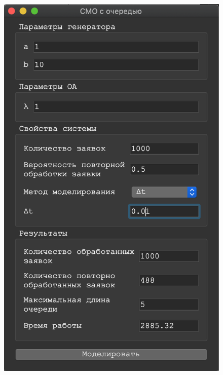 \documentclass[a4paper,12pt]{article}
\begin{document}
\begin{figure}[h!]
\begin{minipage}[b]{0.32\textwidth}
		\end{minipage}
		\begin{minipage}[b]{0.32\textwidth}
			\includegraphics[width=\textwidth]{deltat_3_2.png}
		\end{minipage}
		\begin{minipage}[b]{0.32\textwidth}

\end{minipage}
\end{figure}
\end{document}
